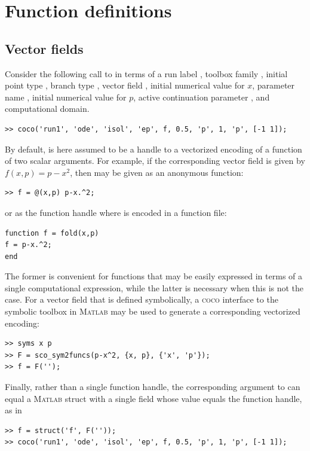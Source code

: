 \section{Function definitions}
\subsection{Vector fields}
Consider the following call to  in terms of a run label , toolbox family , initial point type , branch type , vector field , initial numerical value for $x$, parameter name , initial numerical value for $p$, active continuation parameter , and computational domain.
\begin{lstlisting}[language=coco-highlight,frame=lines]
>> coco('run1', 'ode', 'isol', 'ep', f, 0.5, 'p', 1, 'p', [-1 1]);
\end{lstlisting}
By default,  is here assumed to be a handle to a vectorized encoding of a function of two scalar arguments. For example, if the corresponding vector field is given by $f(x,p)=p-x^2$, then  may be given as an anonymous function:
\begin{lstlisting}[language=coco-highlight,frame=lines]
>> f = @(x,p) p-x.^2;
\end{lstlisting}
or as the function handle  where  is encoded in a function file:
\begin{lstlisting}[language=coco-highlight,frame=shadowbox]
function f = fold(x,p)
f = p-x.^2;
end
\end{lstlisting}
The former is convenient for functions that may be easily expressed in terms of a single computational expression, while the latter is necessary when this is not the case. For a vector field that is defined symbolically, a \textsc{coco} interface to the symbolic toolbox in \textsc{Matlab} may be used to generate a corresponding vectorized encoding:
\begin{lstlisting}[language=coco-highlight,frame=lines]
>> syms x p
>> F = sco_sym2funcs(p-x^2, {x, p}, {'x', 'p'});
>> f = F('');
\end{lstlisting}
Finally, rather than a single function handle, the corresponding argument to  can equal a \textsc{Matlab} struct with a single field  whose value equals the function handle, as in
\begin{lstlisting}[language=coco-highlight,frame=lines]
>> f = struct('f', F(''));
>> coco('run1', 'ode', 'isol', 'ep', f, 0.5, 'p', 1, 'p', [-1 1]);
\end{lstlisting}
